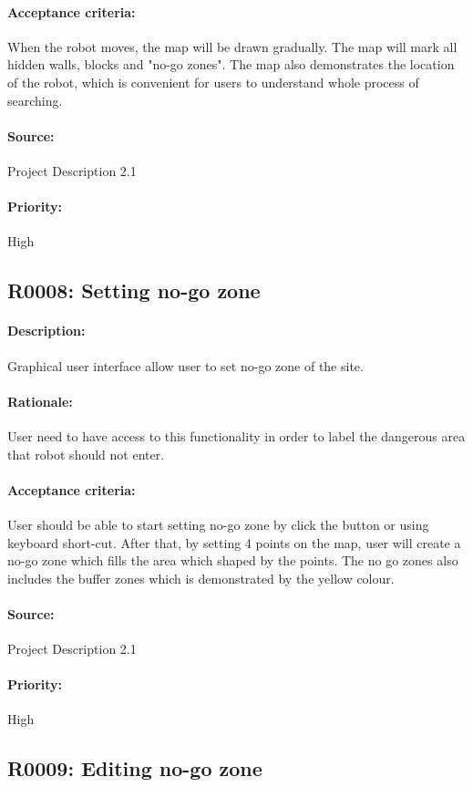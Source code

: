 \documentclass[11pt, a4paper]{report}
\begin{document}
\paragraph{Acceptance criteria:}
When the robot moves, the map will be drawn gradually. The map will mark all hidden walls, blocks and "no-go zones". The map also demonstrates the location of the robot, which is convenient for users to understand whole process of searching.
\paragraph{Source:}
Project Description 2.1
\paragraph{Priority:}
High

\subsection{R0008: Setting no-go zone}
\paragraph{Description:}
Graphical user interface allow user to set no-go zone of the site. 
\paragraph{Rationale:}
User need to have access to this functionality in order to label the dangerous area that robot should not enter.
\paragraph{Acceptance criteria:}
User should be able to start setting no-go zone by click the button or using keyboard short-cut. After that, by setting 4 points on the map, user will create a no-go zone which fills the area which shaped by the points. The no go zones also includes the buffer zones which is demonstrated by the yellow colour.
\paragraph{Source:}
Project Description 2.1
\paragraph{Priority:}
High



\subsection{R0009: Editing no-go zone}
\end{document}
